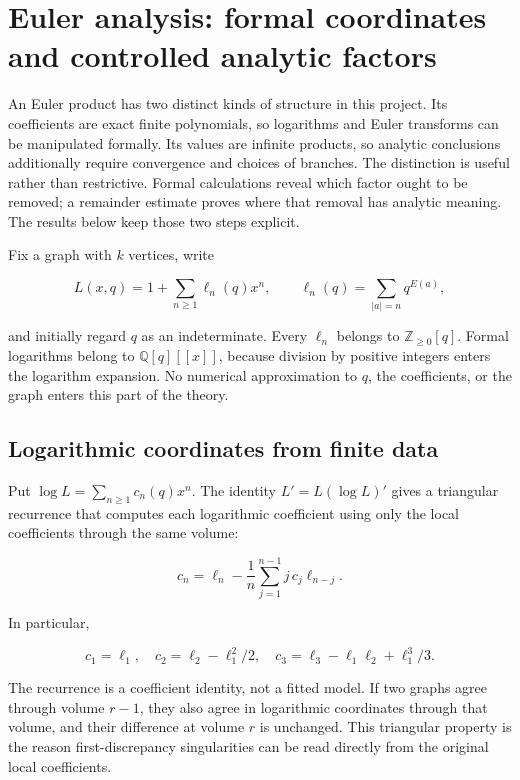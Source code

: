 \documentclass[
  11pt,
  a4paper,
]{report}
\begin{document}
\hypertarget{euler-analysis-formal-coordinates-and-controlled-analytic-factors}{%
\chapter{Euler analysis: formal coordinates and controlled analytic
factors}\label{euler-analysis-formal-coordinates-and-controlled-analytic-factors}}

An Euler product has two distinct kinds of structure in this project.
Its coefficients are exact finite polynomials, so logarithms and Euler
transforms can be manipulated formally. Its values are infinite
products, so analytic conclusions additionally require convergence and
choices of branches. The distinction is useful rather than restrictive.
Formal calculations reveal which factor ought to be removed; a remainder
estimate proves where that removal has analytic meaning. The results
below keep those two steps explicit.

Fix a graph with \(k\) vertices, write

\[
 L(x,q)=1+\sum_{n\ge1}\ell_n(q)x^n,
 \qquad
 \ell_n(q)=\sum_{|a|=n}q^{E(a)},
\]

and initially regard \(q\) as an indeterminate. Every \(\ell_n\) belongs
to \(\mathbb Z_{\ge0}[q]\). Formal logarithms belong to
\(\mathbb Q[q][[x]]\), because division by positive integers enters the
logarithm expansion. No numerical approximation to \(q\), the
coefficients, or the graph enters this part of the theory.

\hypertarget{logarithmic-coordinates-from-finite-data}{%
\section{Logarithmic coordinates from finite
data}\label{logarithmic-coordinates-from-finite-data}}

Put \(\log L=\sum_{n\ge1}c_n(q)x^n\). The identity \(L'=L(\log L)'\)
gives a triangular recurrence that computes each logarithmic coefficient
using only the local coefficients through the same volume:

\[
 c_n=\ell_n-\frac1n\sum_{j=1}^{n-1}j\,c_j\ell_{n-j}.
 \tag{6.1}
\]

In particular,

\[
 c_1=\ell_1,\quad
 c_2=\ell_2-\ell_1^2/2,\quad
 c_3=\ell_3-\ell_1\ell_2+\ell_1^3/3.
\]

The recurrence is a coefficient identity, not a fitted model. If two
graphs agree through volume \(r-1\), they also agree in logarithmic
coordinates through that volume, and their difference at volume \(r\) is
unchanged. This triangular property is the reason first-discrepancy
singularities can be read directly from the original local coefficients.
\end{document}

